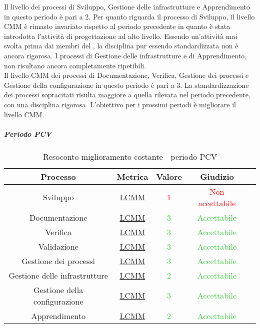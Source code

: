 Il livello  dei processi di Sviluppo, Gestione delle infrastrutture e Apprendimento in questo periodo è pari a 2.
Per quanto riguarda il processo di Sviluppo, il livello CMM è rimasto invariato rispetto al periodo precedente in quanto è stata introdotta l'attività di progettazione ad alto livello. Essendo un'attività mai svolta prima dai membri del , la disciplina pur essendo standardizzata non è ancora rigorosa.
I processi di Gestione delle infrastrutture e di Apprendimento, non risultano ancora completamente ripetibili.\\
Il livello CMM dei processi di Documentazione, Verifica, Gestione dei processi e Gestione della configurazione in questo periodo è pari a 3.
La standardizzazione dei processi sopracitati risulta maggiore a quella rilevata nel periodo precedente, con una disciplina rigorosa.
L'obiettivo per i prossimi periodi è migliorare il livello CMM.

\subparagraph{Periodo PCV}


\begin{table}[H]
	\centering
	
	
	\begin{tabular}{c | c | c | c | c}
		\hline
		\textbf{Processo}          & \textbf{Metrica}                & \textbf{Valore}                            & \textbf{Giudizio}                           \\ \hline
		Sviluppo             & \hyperref[MMC]{LCMM}   & \textcolor{Red}{1}          & \textcolor{Red}{Non accettabile} \\
		Documentazione       & \hyperref[MMC]{LCMM}   & \textcolor{LimeGreen}{3}          & \textcolor{LimeGreen}{Accettabile} \\
		Verifica            & \hyperref[MMC]{LCMM}   & \textcolor{LimeGreen}{3}          & \textcolor{LimeGreen}{Accettabile} \\
		Validazione & \hyperref[MMC]{LCMM}   & \textcolor{LimeGreen}{3}          & \textcolor{LimeGreen}{Accettabile} \\
		Gestione dei processi       & \hyperref[MMC]{LCMM}   & \textcolor{LimeGreen}{3}          & \textcolor{LimeGreen}{Accettabile} \\
		Gestione delle infrastrutture  & \hyperref[MMC]{LCMM}   & \textcolor{LimeGreen}{2}          & \textcolor{LimeGreen}{Accettabile} \\
		Gestione della configurazione   & \hyperref[MMC]{LCMM}   & \textcolor{LimeGreen}{3}          & \textcolor{LimeGreen}{Accettabile} \\
		Apprendimento             & \hyperref[MMC]{LCMM}   & \textcolor{LimeGreen}{2}          & \textcolor{LimeGreen}{Accettabile} \\
		
		
		\hline
	\end{tabular}
	\caption{Resoconto miglioramento costante - periodo PCV}
	\label{tab:resoconto_obiettivo_miglioramento_costante_PCV}
\end{table}

